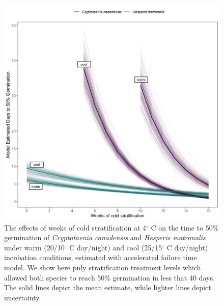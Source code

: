 \documentclass{article}[11pt]
\begin{document}
\begin{figure}[h!]
    \centering
          \includegraphics[width=\textwidth]{..//figure/AFTsivansive.jpeg}
\caption{The effects of weeks of cold stratification at 4$^{\circ}$ C on the time to 50\% germination of \textit {Cryptotaenia canadensis} and \textit{Hesperis matronalis} under warm (20/10$^{\circ}$ C day/night) and cool (25/15$^{\circ}$ C day/night) incubation conditions, estimated with accelerated failure time model. We show here pnly stratification treatment levels which allowed both species to reach 50\% germination in less that 40 days. The solid lines depict the mean estimate, while lighter lines depict uncertainty.} %
    \label{fig:aft}
\end{figure}
\end{document}
